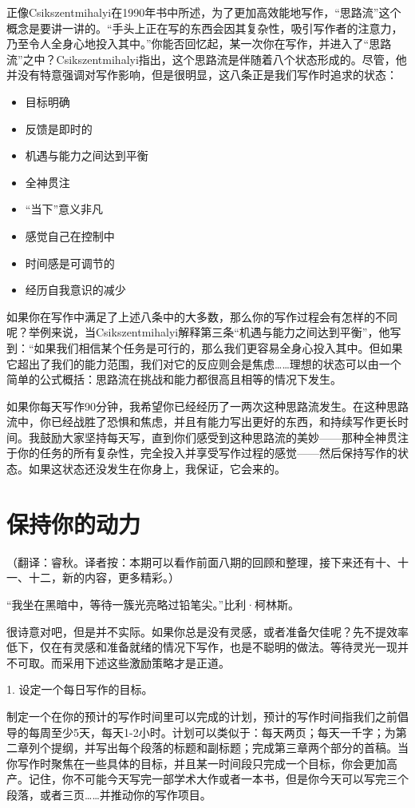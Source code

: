 \documentclass[12pt]{ctexart}
\begin{document}
正像Csikszentmihalyi在1990年书中所述，为了更加高效能地写作，“思路流”这个概念是要讲一讲的。“手头上正在写的东西会因其复杂性，吸引写作者的注意力，乃至令人全身心地投入其中。”你能否回忆起，某一次你在写作，并进入了“思路流”之中？Csikszentmihalyi指出，这个思路流是伴随着八个状态形成的。尽管，他并没有特意强调对写作影响，但是很明显，这八条正是我们写作时追求的状态：

\begin{itemize}
\item 目标明确
\item 反馈是即时的
\item 机遇与能力之间达到平衡
\item 全神贯注
\item “当下”意义非凡
\item 感觉自己在控制中
\item 时间感是可调节的
\item 经历自我意识的减少
\end{itemize}

如果你在写作中满足了上述八条中的大多数，那么你的写作过程会有怎样的不同呢？举例来说，当Csikszentmihalyi解释第三条“机遇与能力之间达到平衡”，他写到：“如果我们相信某个任务是可行的，那么我们更容易全身心投入其中。但如果它超出了我们的能力范围，我们对它的反应则会是焦虑……理想的状态可以由一个简单的公式概括：思路流在挑战和能力都很高且相等的情况下发生。

如果你每天写作90分钟，我希望你已经经历了一两次这种思路流发生。在这种思路流中，你已经战胜了恐惧和焦虑，并且有能力写出更好的东西，和持续写作更长时间。我鼓励大家坚持每天写，直到你们感受到这种思路流的美妙——那种全神贯注于你的任务的所有复杂性，完全投入并享受写作过程的感觉——然后保持写作的状态。如果这状态还没发生在你身上，我保证，它会来的。

\section{保持你的动力}
（翻译：睿秋。译者按：本期可以看作前面八期的回顾和整理，接下来还有十、十一、十二，新的内容，更多精彩。）

“我坐在黑暗中，等待一簇光亮略过铅笔尖。”比利·柯林斯。

很诗意对吧，但是并不实际。如果你总是没有灵感，或者准备欠佳呢？先不提效率低下，仅在有灵感和准备就绪的情况下写作，也是不聪明的做法。等待灵光一现并不可取。而采用下述这些激励策略才是正道。

1. 设定一个每日写作的目标。

制定一个在你的预计的写作时间里可以完成的计划，预计的写作时间指我们之前倡导的每周至少5天，每天1-2小时。计划可以类似于：每天两页；每天一千字；为第二章列个提纲，并写出每个段落的标题和副标题；完成第三章两个部分的首稿。当你写作时聚焦在一些具体的目标，并且某一时间段只完成一个目标，你会更加高产。记住，你不可能今天写完一部学术大作或者一本书，但是你今天可以写完三个段落，或者三页……并推动你的写作项目。
\end{document}
